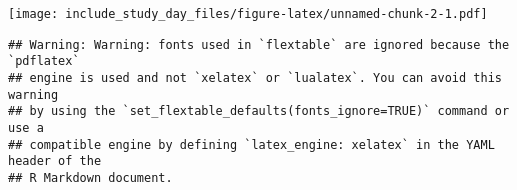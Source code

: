 \documentclass[
]{article}
\newenvironment{Shaded}{\begin{snugshade}}{\end{snugshade}}
\newcommand{\DataTypeTok}[1]{\textcolor[rgb]{0.13,0.29,0.53}{#1}}
\newcommand{\KeywordTok}[1]{\textcolor[rgb]{0.13,0.29,0.53}{\textbf{#1}}}
\newcommand{\NormalTok}[1]{#1}
\newcommand{\OperatorTok}[1]{\textcolor[rgb]{0.81,0.36,0.00}{\textbf{#1}}}
\newcommand{\StringTok}[1]{\textcolor[rgb]{0.31,0.60,0.02}{#1}}
\begin{document}
\texttt{[image: include\_study\_day\_files/figure-latex/unnamed-chunk-2-1.pdf]}

\begin{Shaded}
\end{Shaded}

\begin{verbatim}
## Warning: Warning: fonts used in `flextable` are ignored because the `pdflatex`
## engine is used and not `xelatex` or `lualatex`. You can avoid this warning
## by using the `set_flextable_defaults(fonts_ignore=TRUE)` command or use a
## compatible engine by defining `latex_engine: xelatex` in the YAML header of the
## R Markdown document.
\end{verbatim}

\providecommand{\docline}[3]{\noalign{\global\setlength{\arrayrulewidth}{#1}}\arrayrulecolor[HTML]{#2}\cline{#3}}

\setlength{\tabcolsep}{2pt}

\renewcommand*{\arraystretch}{1.5}
\end{document}
